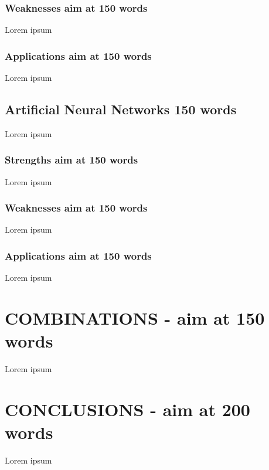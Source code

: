 \documentclass[letterpaper, 10 pt, conference]{ieeeconf}  %
\begin{document}
\subsubsection{Weaknesses aim at 150 words}
Lorem ipsum

\subsubsection{Applications aim at 150 words}
Lorem ipsum

\subsection{Artificial Neural Networks 150 words}
Lorem ipsum

\subsubsection{Strengths aim at 150 words}
Lorem ipsum

\subsubsection{Weaknesses aim at 150 words}
Lorem ipsum

\subsubsection{Applications aim at 150 words}
Lorem ipsum


\section{COMBINATIONS - aim at 150 words}

Lorem ipsum

\section{CONCLUSIONS - aim at 200 words}

Lorem ipsum\cite{gunasekaran2011evaluation}

\addtolength{\textheight}{-12cm}   %










\end{document}
